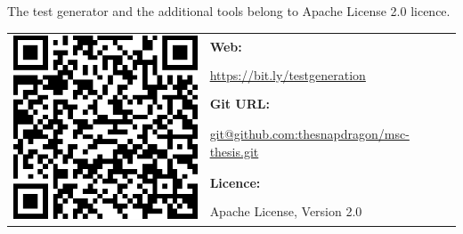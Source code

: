 \appendix
\chapter*{\fuggelek}
\label{cha:appendix}

\setcounter{chapter}{6}  %
\setcounter{equation}{0} %

The test generator and the additional tools belong to Apache License 2.0 licence.

\begin{table}[htb]
\begin{center}
\begin{tabular}{cl}
\multirow{6}{*}{\includegraphics[scale=0.3]{figures/qrcode.png}}
& \textbf{Web:} \\
& \url{https://bit.ly/testgeneration} \\
& \textbf{Git URL:} \\
& \url{git@github.com:thesnapdragon/msc-thesis.git} \\
& \textbf{Licence:} \\
& Apache License, Version 2.0 \\
\end{tabular}
\end{center}
\end{table}

